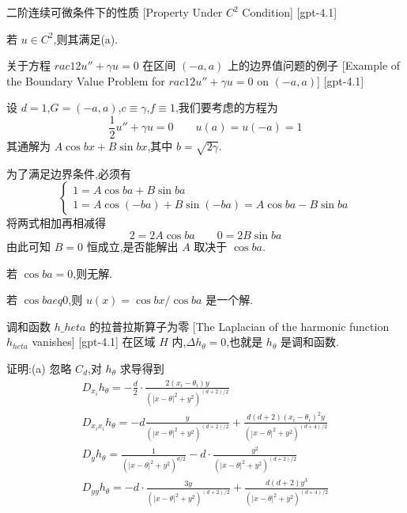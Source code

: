 \documentclass[UTF8]{ctexart}
\begin{document}
    
    
    \begin{thm}
        {二阶连续可微条件下的性质}
        [Property Under $C^2$ Condition]
        [gpt-4.1]
        
若 $
u \in C^2$,则其满足(a).

    \end{thm}
    
    
    
    \begin{xmp}
        [Example-of-the-Boundary-Value-Problem-for-$rac{1}{2}-u-+-\gamma-u-=-0$-on-$-a-a$]
        {关于方程 $rac{1}{2} u'' + \gamma u = 0$ 在区间 $(-a, a)$ 上的边界值问题的例子}
        [Example of the Boundary Value Problem for $rac{1}{2} u'' + \gamma u = 0$ on $(-a, a)$]
        [gpt-4.1]
        
设 $d = 1$,$G = (-a, a)$,$c \equiv \gamma$,$f \equiv 1$,我们要考虑的方程为
\[
\frac{1}{2} u'' + \gamma u = 0 \qquad u(a) = u(-a) = 1
\]
其通解为 $A \cos b x + B \sin b x$,其中 $b = \sqrt{2\gamma}$.

为了满足边界条件,必须有
\[
\begin{cases}
1 = A \cos b a + B \sin b a \\
1 = A \cos(-b a) + B \sin(-b a) = A \cos b a - B \sin b a
\end{cases}
\]
将两式相加再相减得
\[
2 = 2A \cos b a \qquad 0 = 2B \sin b a
\]
由此可知 $B = 0$ 恒成立,是否能解出 $A$ 取决于 $\cos b a$.

若 $\cos b a = 0$,则无解.

若 $\cos b a 
eq 0$,则 $u(x) = \cos b x / \cos b a$ 是一个解.

    \end{xmp}
    
    
    
    \begin{lma}
        {调和函数 $h\_{	heta}$ 的拉普拉斯算子为零}
        [The Laplacian of the harmonic function $h_{	heta}$ vanishes]
        [gpt-4.1]
        在区域 $H$ 内,$\Delta h_{\theta} = 0$,也就是 $h_{\theta}$ 是调和函数.

证明:(a) 忽略 $C_{d}$,对 $h_{\theta}$ 求导得到
\[
\begin{array}{l}
D_{x_{i}} h_{\theta} = -\frac{d}{2} \cdot \frac{2(x_{i} - \theta_{i}) y}{(|x - \theta|^{2} + y^{2})^{(d + 2)/2}} \\[1em]
D_{x_{i} x_{i}} h_{\theta} = -d \frac{y}{(|x - \theta|^{2} + y^{2})^{(d + 2)/2}} + \frac{d(d + 2)(x_{i} - \theta_{i})^{2} y}{(|x - \theta|^{2} + y^{2})^{(d + 4)/2}} \\[1em]
D_{y} h_{\theta} = \frac{1}{(|x - \theta|^{2} + y^{2})^{d/2}} - d \cdot \frac{y^{2}}{(|x - \theta|^{2} + y^{2})^{(d + 2)/2}} \\[1em]
D_{yy} h_{\theta} = -d \cdot \frac{3y}{(|x - \theta|^{2} + y^{2})^{(d + 2)/2}} + \frac{d(d + 2) y^{3}}{(|x - \theta|^{2} + y^{2})^{(d + 4)/2}}
\end{array}
\]

    \end{lma}
    
\end{document}
